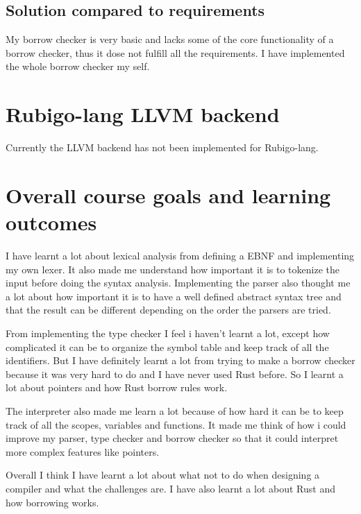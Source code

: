 \documentclass[12pt]{article}
\begin{document}
	\subsection{Solution compared to requirements}
		My borrow checker is very basic and lacks some of the core functionality of a borrow checker, thus it dose not fulfill all the requirements. I have implemented the whole borrow checker my self.  


    \section{Rubigo-lang LLVM backend}	
    	Currently the LLVM backend has not been implemented for Rubigo-lang.
	


    \section{Overall course goals and learning outcomes}
	I have learnt a lot about lexical analysis from defining a EBNF and implementing my own lexer.	It also made me understand how important it is to tokenize the input before doing the syntax analysis. Implementing the parser also thought me a lot about how important it is to have a well defined abstract syntax tree and that the result can be different depending on the order the parsers are tried.

	From implementing the type checker I feel i haven't learnt a lot, except how complicated it can be to organize the symbol table and keep track of all the identifiers. But I have definitely learnt a lot from trying to make a borrow checker because it was very hard to do and I have never used Rust before. So I learnt a lot about pointers and how Rust borrow rules work.

	The interpreter also made me learn a lot because of how hard it can be to keep track of all the scopes, variables and functions. It made me think of how i could improve my parser, type checker and borrow checker so that it could interpret more complex features like pointers.

	Overall I think I have learnt a lot about what not to do when designing a compiler and what the challenges are. I have also learnt a lot about Rust and how borrowing works.
\end{document}
